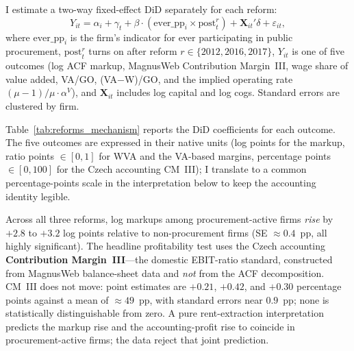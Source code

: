 \documentclass[11pt]{article}
\begin{document}
I estimate a two-way fixed-effect DiD separately for each reform:
\begin{equation}\label{eq:reform_did}
    Y_{it} = \alpha_i + \gamma_t + \beta \cdot (\text{ever\_pp}_i \times \text{post}_t^r) + \mathbf{X}_{it}'\delta + \varepsilon_{it},
\end{equation}
where $\text{ever\_pp}_i$ is the firm's indicator for ever participating in public procurement, $\text{post}_t^r$ turns on after reform $r \in \{2012, 2016, 2017\}$, $Y_{it}$ is one of five outcomes (log ACF markup, MagnusWeb Contribution Margin~III, wage share of value added, VA/GO, (VA$-$W)/GO, and the implied operating rate $(\mu-1)/\mu \cdot \alpha^V$), and $\mathbf{X}_{it}$ includes log capital and log cogs. Standard errors are clustered by firm.



Table~\ref{tab:reforms_mechanism} reports the DiD coefficients for each outcome. The five outcomes are expressed in their native units (log points for the markup, ratio points $\in [0,1]$ for WVA and the VA-based margins, percentage points $\in [0,100]$ for the Czech accounting CM~III); I translate to a common percentage-points scale in the interpretation below to keep the accounting identity legible.

Across all three reforms, log markups among procurement-active firms \emph{rise} by $+2.8$ to $+3.2$ log points relative to non-procurement firms (SE $\approx 0.4$~pp, all highly significant). The headline profitability test uses the Czech accounting \textbf{Contribution Margin~III}---the domestic EBIT-ratio standard, constructed from MagnusWeb balance-sheet data and \emph{not} from the ACF decomposition. CM~III does not move: point estimates are $+0.21$, $+0.42$, and $+0.30$ percentage points against a mean of $\approx 49$~pp, with standard errors near $0.9$~pp; none is statistically distinguishable from zero. A pure rent-extraction interpretation predicts the markup rise and the accounting-profit rise to coincide in procurement-active firms; the data reject that joint prediction.
\end{document}
